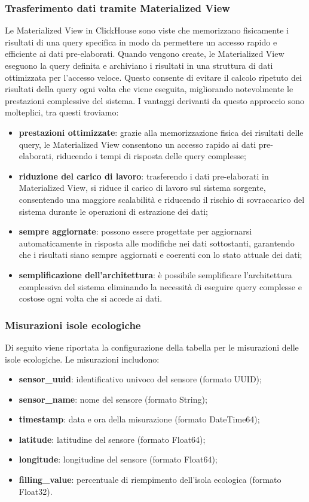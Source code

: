 \subsubsection{Trasferimento dati tramite Materialized View}
Le Materialized View in ClickHouse sono viste che memorizzano fisicamente i risultati di una query specifica in modo da permettere un accesso rapido e efficiente ai dati pre-elaborati. Quando vengono create, le Materialized View eseguono la query definita e archiviano i risultati in una struttura di dati ottimizzata per l'accesso veloce. Questo consente di evitare il calcolo ripetuto dei risultati della query ogni volta che viene eseguita, migliorando notevolmente le prestazioni complessive del sistema. I vantaggi derivanti da questo approccio sono molteplici, tra questi troviamo:
\begin{itemize}
	\item \textbf{prestazioni ottimizzate}: grazie alla memorizzazione fisica dei risultati delle query, le Materialized View consentono un accesso rapido ai dati pre-elaborati, riducendo i tempi di risposta delle query complesse;
	\item \textbf{riduzione del carico di lavoro}: trasferendo i dati pre-elaborati in Materialized View, si riduce il carico di lavoro sul sistema sorgente, consentendo una maggiore scalabilità e riducendo il rischio di sovraccarico del sistema durante le operazioni di estrazione dei dati;
	\item \textbf{sempre aggiornate}: possono essere progettate per aggiornarsi automaticamente in risposta alle modifiche nei dati sottostanti, garantendo che i risultati siano sempre aggiornati e coerenti con lo stato attuale dei dati;
	\item \textbf{semplificazione dell'architettura}: è possibile semplificare l'architettura complessiva del sistema eliminando la necessità di eseguire query complesse e costose ogni volta che si accede ai dati.
\end{itemize}
\subsubsection{Misurazioni isole ecologiche}
Di seguito viene riportata la configurazione della tabella per le misurazioni delle isole ecologiche. Le misurazioni includono:
\begin{itemize}
	\item \textbf{sensor\_uuid}: identificativo univoco del sensore (formato UUID);
	\item \textbf{sensor\_name}: nome del sensore (formato String);
	\item \textbf{timestamp}: data e ora della misurazione (formato DateTime64);
	\item \textbf{latitude}: latitudine del sensore (formato Float64);
	\item \textbf{longitude}: longitudine del sensore (formato Float64);
	\item \textbf{filling\_value}: percentuale di riempimento dell'isola ecologica (formato Float32).
\end{itemize}
